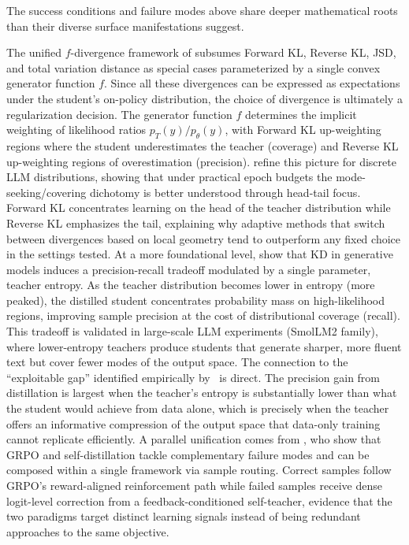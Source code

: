 \documentclass{article} %
\newcommand{\ptheta}{p_\theta}
\newcommand{\pteacher}{p_T}
\begin{document}
The success conditions and failure modes above share deeper mathematical roots than their diverse surface manifestations suggest.

The unified $f$-divergence framework of \citet{2307.15190} subsumes Forward KL, Reverse KL, JSD, and total variation distance as special cases parameterized by a single convex generator function $f$. Since all these divergences can be expressed as expectations under the student's on-policy distribution, the choice of divergence is ultimately a regularization decision. The generator function $f$ determines the implicit weighting of likelihood ratios $\pteacher(y)/\ptheta(y)$, with Forward KL up-weighting regions where the student underestimates the teacher (coverage) and Reverse KL up-weighting regions of overestimation (precision). \citet{2404.02657} refine this picture for discrete LLM distributions, showing that under practical epoch budgets the mode-seeking/covering dichotomy is better understood through head-tail focus. Forward KL concentrates learning on the head of the teacher distribution while Reverse KL emphasizes the tail, explaining why adaptive methods that switch between divergences based on local geometry tend to outperform any fixed choice in the settings tested. At a more foundational level, \citet{2505.13111} show that KD in generative models induces a precision-recall tradeoff modulated by a single parameter, teacher entropy. As the teacher distribution becomes lower in entropy (more peaked), the distilled student concentrates probability mass on high-likelihood regions, improving sample precision at the cost of distributional coverage (recall). This tradeoff is validated in large-scale LLM experiments (SmolLM2 family), where lower-entropy teachers produce students that generate sharper, more fluent text but cover fewer modes of the output space. The connection to the ``exploitable gap'' identified empirically by~\citet{2604.13016} is direct. The precision gain from distillation is largest when the teacher's entropy is substantially lower than what the student would achieve from data alone, which is precisely when the teacher offers an informative compression of the output space that data-only training cannot replicate efficiently. A parallel unification comes from \citet{2604.02288}, who show that GRPO and self-distillation tackle complementary failure modes and can be composed within a single framework via sample routing. Correct samples follow GRPO's reward-aligned reinforcement path while failed samples receive dense logit-level correction from a feedback-conditioned self-teacher, evidence that the two paradigms target distinct learning signals instead of being redundant approaches to the same objective.
\end{document}

